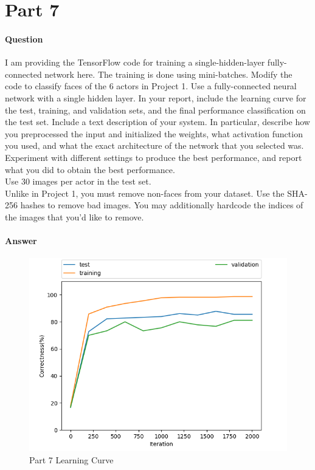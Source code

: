 \documentclass[11pt,twoside]{article}
\begin{document}
\clearpage

\section*{Part 7}
\paragraph{Question}
I am providing the TensorFlow code for training a single-hidden-layer fully-connected network here. The training is done using mini-batches. Modify the code to classify faces of the 6 actors in Project 1. Use a fully-connected neural network with a single hidden layer. In your report, include the learning curve for the test, training, and validation sets, and the final performance classification on the test set. Include a text description of your system. In particular, describe how you preprocessed the input and initialized the weights, what activation function you used, and what the exact architecture of the network that you selected was. Experiment with different settings to produce the best performance, and report what you did to obtain the best performance.\\

Use 30 images per actor in the test set.\\

Unlike in Project 1, you must remove non-faces from your dataset. Use the SHA-256 hashes to remove bad images. You may additionally hardcode the indices of the images that you’d like to remove.\\

\paragraph{Answer}
\begin{figure}[h]
	\centering
	\includegraphics[scale=0.8]{part7.png}
	\caption*{Part 7 Learning Curve}
\end{figure}
\end{document}
